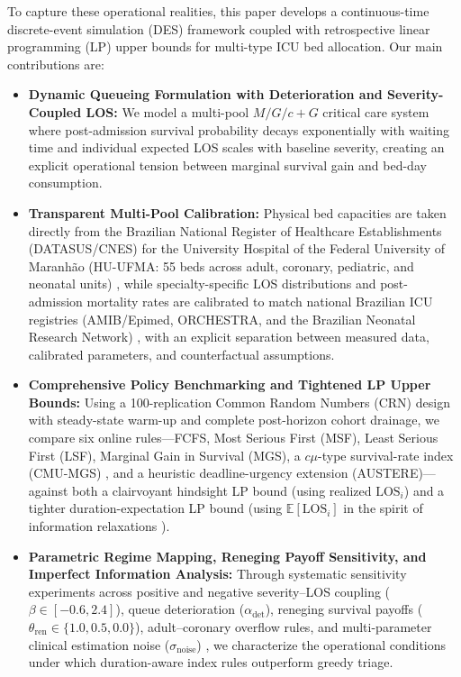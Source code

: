 \documentclass[final,5p,times,twocolumn]{elsarticle}
\begin{document}
To capture these operational realities, this paper develops a continuous-time discrete-event simulation (DES) framework coupled with retrospective linear programming (LP) upper bounds for multi-type ICU bed allocation. Our main contributions are:
\begin{itemize}
    \item \textbf{Dynamic Queueing Formulation with Deterioration and Severity-Coupled LOS:} We model a multi-pool $M/G/c+G$ critical care system where post-admission survival probability decays exponentially with waiting time and individual expected LOS scales with baseline severity, creating an explicit operational tension between marginal survival gain and bed-day consumption.
    \item \textbf{Transparent Multi-Pool Calibration:} Physical bed capacities are taken directly from the Brazilian National Register of Healthcare Establishments (DATASUS/CNES) for the University Hospital of the Federal University of Maranh\~ao (HU-UFMA: 55 beds across adult, coronary, pediatric, and neonatal units) \cite{cnes_datasus_huufma}, while specialty-specific LOS distributions and post-admission mortality rates are calibrated to match national Brazilian ICU registries (AMIB/Epimed, ORCHESTRA, and the Brazilian Neonatal Research Network) \cite{utisbrasileiras2024, soares2024orchestra, zampieri2019icu, guinsburg2016death, cardoso2011impact}, with an explicit separation between measured data, calibrated parameters, and counterfactual assumptions.
    \item \textbf{Comprehensive Policy Benchmarking and Tightened LP Upper Bounds:} Using a 100-replication Common Random Numbers (CRN) design with steady-state warm-up and complete post-horizon cohort drainage, we compare six online rules---FCFS, Most Serious First (MSF), Least Serious First (LSF), Marginal Gain in Survival (MGS), a $c\mu$-type survival-rate index (CMU-MGS) \cite{buyukkoc1985cmu}, and a heuristic deadline-urgency extension (AUSTERE)---against both a clairvoyant hindsight LP bound (using realized $\text{LOS}_i$) and a tighter duration-expectation LP bound (using $\mathbb{E}[\text{LOS}_i]$ in the spirit of information relaxations \cite{brown2010information}).
    \item \textbf{Parametric Regime Mapping, Reneging Payoff Sensitivity, and Imperfect Information Analysis:} Through systematic sensitivity experiments across positive and negative severity--LOS coupling ($\beta \in [-0.6, 2.4]$), queue deterioration ($\alpha_{\text{det}}$), reneging survival payoffs ($\theta_{\text{ren}} \in \{1.0, 0.5, 0.0\}$), adult--coronary overflow rules, and multi-parameter clinical estimation noise ($\sigma_{\text{noise}}$) \cite{argon2009priority}, we characterize the operational conditions under which duration-aware index rules outperform greedy triage.
\end{itemize}
\end{document}
